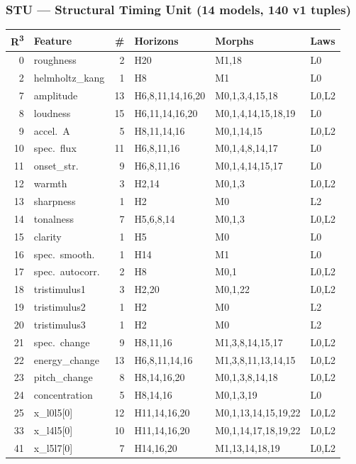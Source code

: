 \subsubsection*{STU --- Structural Timing Unit (14 models, 140 v1 tuples)}

{\footnotesize
\begin{longtable}{@{}r l r l l l@{}}
\toprule
\textbf{R\textsuperscript{3}} & \textbf{Feature} & \textbf{\#}
  & \textbf{Horizons} & \textbf{Morphs} & \textbf{Laws} \\
\midrule
\endfirsthead
\midrule
\endhead
\endfoot
\bottomrule
\endlastfoot

\rowcolor{grpA}
0 & roughness & 2 & H20 & M1,18 & L0 \\
\rowcolor{grpA}
2 & helmholtz\_kang & 1 & H8 & M1 & L0 \\
\rowcolor{grpB}
7 & amplitude & 13 & H6,8,11,14,16,20 & M0,1,3,4,15,18 & L0,L2 \\
\rowcolor{grpB}
8 & loudness & 15 & H6,11,14,16,20 & M0,1,4,14,15,18,19 & L0 \\
\rowcolor{grpB}
9 & accel.~A & 5 & H8,11,14,16 & M0,1,14,15 & L0,L2 \\
\rowcolor{grpB}
10 & spec.~flux & 11 & H6,8,11,16 & M0,1,4,8,14,17 & L0 \\
\rowcolor{grpB}
11 & onset\_str. & 9 & H6,8,11,16 & M0,1,4,14,15,17 & L0 \\
\rowcolor{grpC}
12 & warmth & 3 & H2,14 & M0,1,3 & L0,L2 \\
\rowcolor{grpC}
13 & sharpness & 1 & H2 & M0 & L2 \\
\rowcolor{grpC}
14 & tonalness & 7 & H5,6,8,14 & M0,1,3 & L0,L2 \\
\rowcolor{grpC}
15 & clarity & 1 & H5 & M0 & L0 \\
\rowcolor{grpC}
16 & spec.~smooth. & 1 & H14 & M1 & L0 \\
\rowcolor{grpC}
17 & spec.~autocorr. & 2 & H8 & M0,1 & L0,L2 \\
\rowcolor{grpC}
18 & tristimulus1 & 3 & H2,20 & M0,1,22 & L0,L2 \\
\rowcolor{grpC}
19 & tristimulus2 & 1 & H2 & M0 & L2 \\
\rowcolor{grpC}
20 & tristimulus3 & 1 & H2 & M0 & L2 \\
\rowcolor{grpD}
21 & spec.~change & 9 & H8,11,16 & M1,3,8,14,15,17 & L0,L2 \\
\rowcolor{grpD}
22 & energy\_change & 13 & H6,8,11,14,16 & M1,3,8,11,13,14,15 & L0,L2 \\
\rowcolor{grpD}
23 & pitch\_change & 8 & H8,14,16,20 & M0,1,3,8,14,18 & L0,L2 \\
\rowcolor{grpD}
24 & concentration & 5 & H8,14,16 & M0,1,3,19 & L0 \\
\rowcolor{grpE}
25 & x\_l0l5[0] & 12 & H11,14,16,20 & M0,1,13,14,15,19,22 & L0,L2 \\
\rowcolor{grpE}
33 & x\_l4l5[0] & 10 & H11,14,16,20 & M0,1,14,17,18,19,22 & L0,L2 \\
\rowcolor{grpE}
41 & x\_l5l7[0] & 7 & H14,16,20 & M1,13,14,18,19 & L0,L2 \\
\end{longtable}
}


